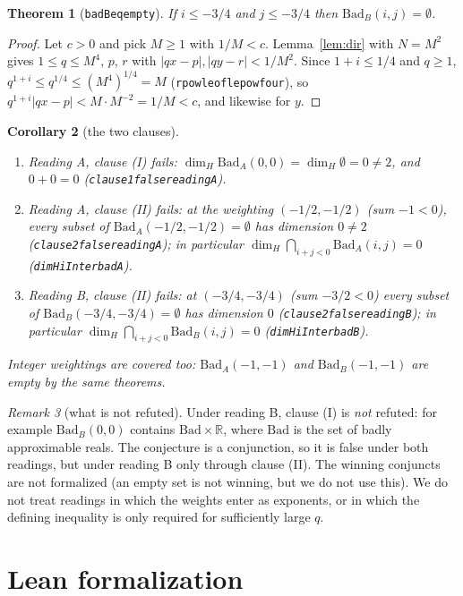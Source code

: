 \documentclass[11pt]{article}
\newtheorem{theorem}{Theorem}
\newtheorem{corollary}[theorem]{Corollary}
\theoremstyle{definition}
\theoremstyle{remark}
\newtheorem{remark}[theorem]{Remark}
\renewcommand{\_}{\oldus\allowbreak}
\newcommand{\BadA}{\mathrm{Bad}_A}
\newcommand{\BadB}{\mathrm{Bad}_B}
\begin{document}
\begin{theorem}[\texttt{badB\_eq\_empty}]
If $i\le -3/4$ and $j\le -3/4$ then $\BadB(i,j)=\emptyset$.
\end{theorem}
\begin{proof}
Let $c>0$ and pick $M\ge1$ with $1/M<c$. Lemma~\ref{lem:dir} with $N=M^2$ gives $1\le q\le M^4$, $p$, $r$ with
$|qx-p|,|qy-r|<1/M^2$. Since $1+i\le 1/4$ and $q\ge1$, $q^{1+i}\le q^{1/4}\le (M^4)^{1/4}=M$
(\texttt{rpow\_le\_of\_le\_pow\_four}), so $q^{1+i}|qx-p|<M\cdot M^{-2}=1/M<c$, and likewise for $y$.
\end{proof}

\begin{corollary}[the two clauses]
\begin{enumerate}[label=(\alph*)]
  \item Reading A, clause (I) fails: $\dim_H\BadA(0,0)=\dim_H\emptyset=0\neq2$, and $0+0=0$
        (\texttt{clause1\_false\_readingA}).
  \item Reading A, clause (II) fails: at the weighting $(-1/2,-1/2)$ (sum $-1<0$), every subset of
        $\BadA(-1/2,-1/2)=\emptyset$ has dimension $0\ne2$ (\texttt{clause2\_false\_readingA}); in particular
        $\dim_H\bigcap_{i+j<0}\BadA(i,j)=0$ (\texttt{dimH\_iInter\_badA}).
  \item Reading B, clause (II) fails: at $(-3/4,-3/4)$ (sum $-3/2<0$) every subset of
        $\BadB(-3/4,-3/4)=\emptyset$ has dimension $0$ (\texttt{clause2\_false\_readingB}); in particular
        $\dim_H\bigcap_{i+j<0}\BadB(i,j)=0$ (\texttt{dimH\_iInter\_badB}).
\end{enumerate}
Integer weightings are covered too: $\BadA(-1,-1)$ and $\BadB(-1,-1)$ are empty by the same theorems.
\end{corollary}

\begin{remark}[what is not refuted]
Under reading B, clause (I) is \emph{not} refuted: for example $\BadB(0,0)$ contains $\mathrm{Bad}\times\mathbb{R}$,
where $\mathrm{Bad}$ is the set of badly approximable reals. The conjecture is a conjunction, so it is false
under both readings, but under reading B only through clause (II). The winning conjuncts are not formalized
(an empty set is not winning, but we do not use this). We do not treat readings in which the weights enter as
exponents, or in which the defining inequality is only required for sufficiently large $q$.
\end{remark}

\section{Lean formalization}
\end{document}
